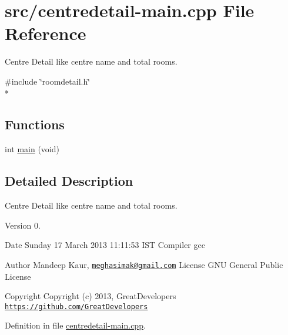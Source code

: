 \hypertarget{centredetail-main_8cpp}{\section{src/centredetail-\/main.cpp File Reference}
\label{centredetail-main_8cpp}
}


Centre Detail like centre name and total rooms.  


{\ttfamily \#include \char`\"{}roomdetail.\-h\char`\"{}}\\*
\subsection*{Functions}
\begin{DoxyCompactItemize}
\item 
int \hyperlink{centredetail-main_8cpp_a840291bc02cba5474a4cb46a9b9566fe}{main} (void)
\end{DoxyCompactItemize}


\subsection{Detailed Description}
Centre Detail like centre name and total rooms. \begin{DoxyVersion}{Version}
0. 
\end{DoxyVersion}
\begin{DoxyDate}{Date}
Sunday 17 March 2013 11\-:11\-:53 I\-S\-T Compiler gcc
\end{DoxyDate}
\begin{DoxyAuthor}{Author}
Mandeep Kaur, \href{mailto:meghasimak@gmail.com}{\tt meghasimak@gmail.\-com} License G\-N\-U General Public License 
\end{DoxyAuthor}
\begin{DoxyCopyright}{Copyright}
Copyright (c) 2013, Great\-Developers \href{https://github.com/GreatDevelopers}{\tt https\-://github.\-com/\-Great\-Developers} 
\end{DoxyCopyright}


Definition in file \hyperlink{centredetail-main_8cpp_source}{centredetail-\/main.\-cpp}.



